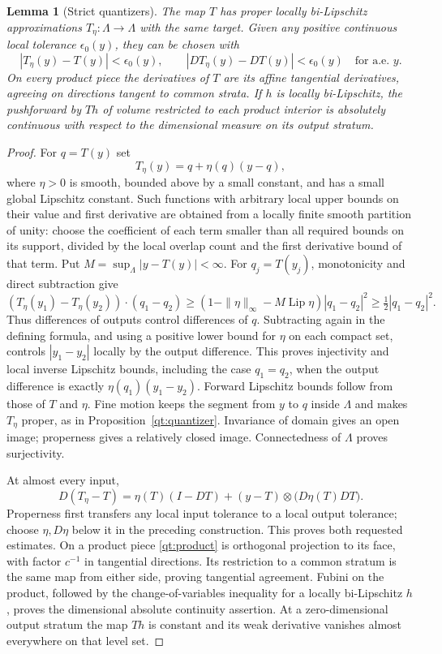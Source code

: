 \documentclass[11pt]{article}
\numberwithin{equation}{section}
\newtheorem{lemma}[theorem]{Lemma}
\theoremstyle{definition}
\theoremstyle{remark}
\DeclareMathOperator{\Lip}{Lip}
\begin{document}
\begin{lemma}[Strict quantizers]\label{qt:strict}
The map $T$ has proper locally bi-Lipschitz approximations
$T_\eta:\Lambda\to\Lambda$ with the same target.  Given any positive
continuous local tolerance $\epsilon_0(y)$, they can be chosen with
\[
 |T_\eta(y)-T(y)|<\epsilon_0(y),\qquad
 |DT_\eta(y)-DT(y)|<\epsilon_0(y)\quad\text{for a.e. }y.
\]
On every product piece the derivatives of $T$ are its affine
tangential derivatives, agreeing on directions tangent to common
strata.  If $h$ is locally bi-Lipschitz, the pushforward by $Th$ of
volume restricted to each product interior is absolutely continuous
with respect to the dimensional measure on its output stratum.
\end{lemma}

\begin{proof}
For $q=T(y)$ set
\[
 T_\eta(y)=q+\eta(q)(y-q),
\]
where $\eta>0$ is smooth, bounded above by a small constant, and has a
small global Lipschitz constant.  Such functions with arbitrary local
upper bounds on their value and first derivative are obtained from a
locally finite smooth partition of unity: choose the coefficient of
each term smaller than all required bounds on its support, divided by
the local overlap count and the first derivative bound of that term.
Put $M=\sup_{\Lambda}|y-T(y)|<\infty$.  For $q_j=T(y_j)$,
monotonicity and direct subtraction give
\[
 (T_\eta(y_1)-T_\eta(y_2))\cdot(q_1-q_2)
 \geq(1-\|\eta\|_\infty-M\Lip\eta)|q_1-q_2|^2
 \geq\tfrac12|q_1-q_2|^2.
\]
Thus differences of outputs control differences of $q$.  Subtracting
again in the defining formula, and using a positive lower bound for
$\eta$ on each compact set, controls $|y_1-y_2|$ locally by the output
difference.  This proves injectivity and local inverse Lipschitz
bounds, including the case $q_1=q_2$, when the output difference is
exactly $\eta(q_1)(y_1-y_2)$.  Forward Lipschitz bounds follow from those
of $T$ and $\eta$.  Fine motion keeps the segment from $y$ to $q$
inside $\Lambda$ and makes $T_\eta$ proper, as in
Proposition~\ref{qt:quantizer}.  Invariance of domain gives an open
image; properness gives a relatively closed image.  Connectedness of
$\Lambda$ proves surjectivity.

At almost every input,
\[
 D(T_\eta-T)=\eta(T)(I-DT)
 +(y-T)\otimes\bigl(D\eta(T)DT\bigr).
\]
Properness first transfers any local input tolerance to a local output
tolerance; choose $\eta,D\eta$ below it in the preceding construction.
This proves both requested estimates.  On a product piece
\eqref{qt:product} is orthogonal projection to its face, with factor
$c^{-1}$ in tangential directions.  Its restriction to a common stratum
is the same map from either side, proving tangential agreement.
Fubini on the product, followed by the change-of-variables inequality
for a locally bi-Lipschitz $h$, proves the dimensional absolute
continuity assertion.  At a zero-dimensional output stratum the map
$Th$ is constant and its weak derivative vanishes almost everywhere
on that level set.
\end{proof}
\end{document}
